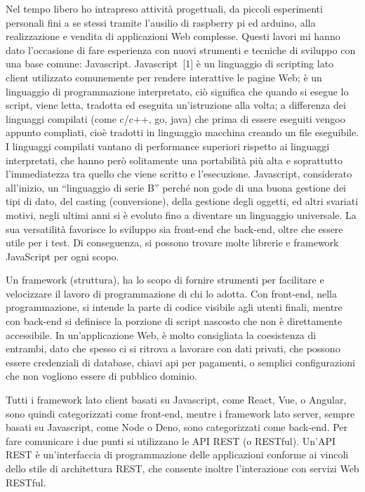 \documentclass[12pt,a4paper]{article}
\begin{document}
Nel tempo libero ho intrapreso attività progettuali, da piccoli esperimenti personali fini a se stessi tramite l’ausilio di raspberry pi ed arduino, alla realizzazione e vendita di applicazioni Web complesse. Questi lavori mi hanno dato l’occasione di fare esperienza con nuovi strumenti e tecniche di sviluppo con una base comune: Javascript.
\label{javascript}
Javascript~[1] è un linguaggio di scripting lato client utilizzato comunemente per rendere interattive le pagine Web; è un linguaggio di programmazione interpretato, ciò significa che quando si esegue lo script, viene letta, tradotta ed eseguita un’istruzione alla volta; a differenza dei linguaggi compilati (come c/c++, go, java) che prima di essere eseguiti vengoo appunto compliati, cioè tradotti in linguaggio macchina  creando un file eseguibile. I linguaggi compilati vantano di performance superiori rispetto ai linguaggi interpretati, che hanno però solitamente una portabilità più alta e soprattutto l’immediatezza tra quello che viene scritto e l’esecuzione.
Javascript, considerato all’inizio, un “linguaggio di serie B” perché non gode di una buona gestione dei tipi di dato, del casting (conversione), della gestione degli oggetti, ed altri svariati motivi, negli ultimi anni si è evoluto fino a diventare un linguaggio universale. La sua versatilità favorisce lo sviluppo sia front-end che back-end, oltre che essere utile per i test. Di conseguenza, si possono trovare molte librerie e framework JavaScript per ogni scopo.

Un framework (struttura), ha lo scopo di fornire strumenti per facilitare e velocizzare il lavoro di programmazione di chi lo adotta.
Con front-end, nella programmazione, si intende la parte di codice visibile agli utenti finali, mentre con back-end si definisce la porzione di script nascosto che non è direttamente accessibile.
In un’applicazione Web, è molto consigliata la coesistenza di entrambi, dato che spesso ci si ritrova a lavorare con dati privati, che possono essere credenziali di database, chiavi api per pagamenti, o semplici configurazioni che non vogliono essere di pubblico dominio.

Tutti i framework lato client basati su Javascript, come React, Vue, o Angular, sono quindi categorizzati come front-end, mentre i framework lato server, sempre basati su Javascript, come Node o Deno, sono categorizzati come back-end. Per fare comunicare i due punti si utilizzano le API REST (o RESTful). Un'API REST è un'interfaccia di programmazione delle applicazioni conforme ai vincoli dello stile di architettura REST, che consente inoltre l'interazione con servizi Web RESTful.
\end{document}
